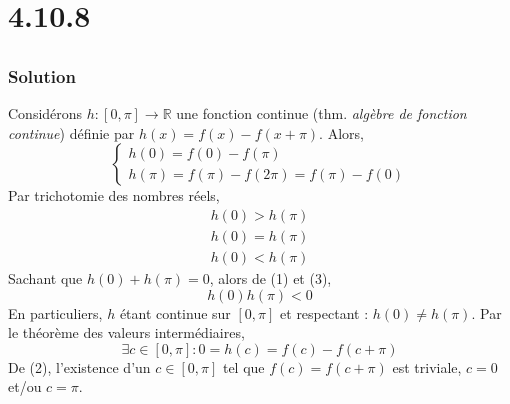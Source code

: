 	\section*{4.10.8}
		\subsection{}
		\subsubsection*{Solution}
		Considérons $h:[0,\pi]\longrightarrow\mathbb{R}$ une fonction continue (thm. \textit{algèbre de fonction continue}) définie par $h(x)=f(x)-f(x+\pi)$. Alors,
		\[
		\begin{cases}
		h(0)=f(0)-f(\pi)\\
		h(\pi)=f(\pi)-f(2\pi)=f(\pi)-f(0)
		\end{cases}\]
		Par trichotomie des nombres réels,
		\begin{align}
			h(0)>h(\pi)\\
			h(0)=h(\pi)\\
			h(0)<h(\pi)
		\end{align}
		Sachant que $h(0)+h(\pi)=0$, alors de (1) et (3),
		\[h(0)h(\pi)<0\]
		En particuliers, $h$ étant continue sur $[0,\pi]$ et respectant : $h(0)\neq h(\pi)$. Par le théorème des valeurs intermédiaires,
		\[\exists c\in[0,\pi] : 0=h(c)=f(c)-f(c+\pi) \]
		De (2), l'existence d'un $c\in [0,\pi]$ tel que $f(c)=f(c+\pi)$ est triviale, $c=0$ et/ou $c=\pi$.
